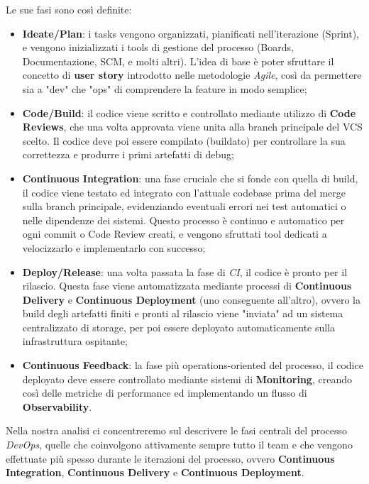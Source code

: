 \documentclass[../main.tex]{subfiles}
\begin{document}
        		Le sue fasi sono così definite:
        		\begin{itemize}
        			\item \textbf{Ideate/Plan}: i tasks vengono organizzati, pianificati nell'iterazione (Sprint), e vengono inizializzati i tools di gestione del processo (Boards, Documentazione, SCM, e molti altri). L'idea di base è poter sfruttare il concetto di \textbf{user story} introdotto nelle metodologie \emph{Agile}, così da permettere sia a "dev" che "ops" di comprendere la feature in modo semplice;
        			\item \textbf{Code/Build}: il codice viene scritto e controllato mediante utilizzo di \textbf{Code Reviews}, che una volta approvata viene unita alla branch principale del VCS scelto. Il codice deve poi essere compilato (buildato) per controllare la sua correttezza e produrre i primi artefatti di debug;
        			\item \textbf{Continuous Integration}: una fase cruciale che si fonde con quella di build, il codice viene testato ed integrato con l'attuale codebase prima del merge sulla branch principale, evidenziando eventuali errori nei test automatici o nelle dipendenze dei sistemi. Questo processo è continuo e automatico per ogni commit o Code Review creati, e vengono sfruttati tool dedicati a velocizzarlo e implementarlo con successo;
        			\item \textbf{Deploy/Release}: una volta passata la fase di \emph{CI}, il codice è pronto per il rilascio. Questa fase viene automatizzata mediante processi di \textbf{Continuous Delivery} e \textbf{Continuous Deployment} (uno conseguente all'altro), ovvero la build degli artefatti finiti e pronti al rilascio viene "inviata" ad un sistema centralizzato di storage, per poi essere deployato automaticamente sulla infrastruttura ospitante;
        			\item \textbf{Continuous Feedback}: la fase più operations-oriented del processo, il codice deployato deve essere controllato mediante sistemi di \textbf{Monitoring}, creando così delle metriche di performance ed implementando un flusso di \textbf{Observability}.
        		\end{itemize}
        		
        		Nella nostra analisi ci concentreremo sul descrivere le fasi centrali del processo \emph{DevOps}, quelle che coinvolgono attivamente sempre tutto il team e che vengono effettuate più spesso durante le iterazioni del processo, ovvero \textbf{Continuous Integration}, \textbf{Continuous Delivery} e \textbf{Continuous Deployment}.
        		
\end{document}
